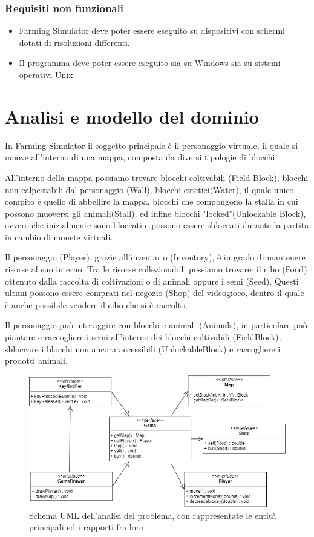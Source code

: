 \documentclass[a4paper,12pt]{report}
\begin{document}
\subsubsection{Requisiti non funzionali}
\begin{itemize}
	\item Farming Simulator deve poter essere eseguito su dispositivi con schermi dotati di risoluzioni differenti.
	\item Il programma deve poter essere eseguito sia su Windows sia su sistemi operativi Unix
\end{itemize}

\hfill\break
\section{Analisi e modello del dominio}

In Farming Simulator il soggetto principale è il personaggio virtuale, il quale si muove all'interno di una mappa, composta da diversi tipologie di blocchi. 

All'interno della mappa possiamo trovare blocchi coltivabili (Field Block), blocchi non calpestabili dal personaggio (Wall), blocchi estetici(Water), il quale unico compito è quello di abbellire la mappa, blocchi che compongono la stalla in cui possono muoversi gli animali(Stall), ed infine blocchi "locked"(Unlockable Block), ovvero che inizialmente sono bloccati e possono essere sbloccati durante la partita in cambio di monete virtuali.

Il personaggio (Player), grazie all'inventario (Inventory), è in grado di mantenere risorse al suo interno. Tra le risorse collezionabili possiamo trovare: il cibo (Food) ottenuto dalla raccolta di coltivazioni o di animali oppure i semi (Seed).
Questi ultimi possono essere comprati nel negozio (Shop) del videogioco, dentro il quale è anche possibile vendere il cibo che si è raccolto.

Il personaggio può interaggire con blocchi e animali (Animals), in particolare può piantare e raccogliere i semi all'interno dei blocchi coltivabili (FieldBlock), sbloccare i blocchi non ancora accessibili (UnlockableBlock) e raccogliere i prodotti animali.

\begin{figure}[!htb]
\centerline{\includegraphics[width=\textwidth]{img/UML_1-1.png}}
\caption{Schema UML dell'analisi del problema, con rappresentate le entità principali ed i rapporti fra loro}
\label{img:analysis}
\end{figure}
\end{document}
